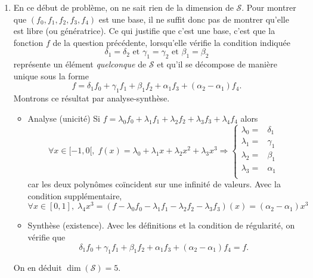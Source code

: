 \begin{enumerate}
  \item En ce début de problème, on ne sait rien de la dimension de $\mathcal{S}$. Pour montrer que $(f_0,f_1,f_2,f_3,f_4)$ est une base, il ne suffit donc pas de montrer qu'elle est libre (ou génératrice). Ce qui justifie que c'est une base, c'est que la fonction $f$ de la question précédente, lorsqu'elle vérifie la condition indiquée 
\begin{displaymath}
\delta_1 = \delta_2 \text{ et } \gamma_1 = \gamma_2 \text{ et }\beta_1 = \beta_2
\end{displaymath}  
  représente un élément \emph{quelconque} de $\mathcal{S}$ et qu'il se décompose de manière unique sous la forme 
\begin{displaymath}
  f = \delta_1 f_0 + \gamma_1 f_1 + \beta_1 f_2 + \alpha_1 f_3 + (\alpha_2-\alpha_1)f_4.
\end{displaymath}
Montrons ce résultat par analyse-synthèse.
\begin{itemize}
  \item Analyse (unicité) Si $f = \lambda_0 f_0 + \lambda_1 f_1 + \lambda_2 f_2 + \lambda_3 f_3 + \lambda_4 f_4$ alors
\begin{displaymath}
\forall x\in [-1, 0[, \;f(x) = \lambda_0  + \lambda_1 x + \lambda_2 x^2 + \lambda_3 x^3 
\Rightarrow 
\left\lbrace 
\begin{aligned}
  \lambda_0 =& \delta_1 \\ \lambda_1 =& \gamma_1 \\ \lambda_2 =& \beta_1 \\ \lambda_3 =& \alpha_1 \\
\end{aligned}
\right. 
\end{displaymath}
car les deux polynômes coïncident sur une infinité de valeurs. Avec la condition supplémentaire,
\begin{displaymath}
\forall x \in [0,1], \;
\lambda_4 x^3 = \left( f -\lambda_0 f_0 - \lambda_1 f_1 - \lambda_2 f_2 - \lambda_3 f_3\right)(x)
= (\alpha_2 - \alpha_1)x^3
\end{displaymath}
\item Synthèse (existence). Avec les définitions et la condition de régularité, on vérifie que 
\begin{displaymath}
  \delta_1 f_0 + \gamma_1 f_1 + \beta_1 f_2 + \alpha_1 f_3 + (\alpha_2-\alpha_1)f_4 = f.
\end{displaymath}
\end{itemize}
On en déduit $\dim(\mathcal{S}) = 5$.
\end{enumerate}

